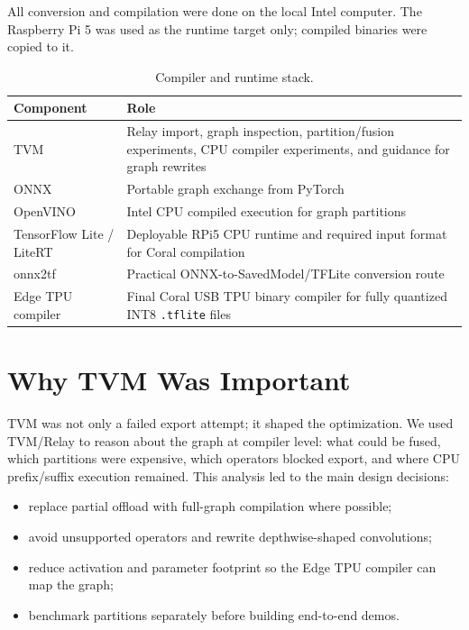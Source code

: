 \documentclass[11pt]{article}
\begin{document}
All conversion and compilation were done on the local Intel computer. The Raspberry Pi 5 was used as the runtime target only; compiled binaries were copied to it.

\begin{table}[H]
\centering
\caption{Compiler and runtime stack.}
\small
\begin{tabularx}{\textwidth}{Z{0.22\textwidth}Y}
\toprule
Component & Role \\
\midrule
TVM & Relay import, graph inspection, partition/fusion experiments, CPU compiler experiments, and guidance for graph rewrites \\
ONNX & Portable graph exchange from PyTorch \\
OpenVINO & Intel CPU compiled execution for graph partitions \\
TensorFlow Lite / LiteRT & Deployable RPi5 CPU runtime and required input format for Coral compilation \\
onnx2tf & Practical ONNX-to-SavedModel/TFLite conversion route \\
Edge TPU compiler & Final Coral USB TPU binary compiler for fully quantized INT8 \texttt{.tflite} files \\
\bottomrule
\end{tabularx}
\end{table}

\section{Why TVM Was Important}

TVM was not only a failed export attempt; it shaped the optimization. We used TVM/Relay to reason about the graph at compiler level: what could be fused, which partitions were expensive, which operators blocked export, and where CPU prefix/suffix execution remained. This analysis led to the main design decisions:

\begin{itemize}[leftmargin=*]
  \item replace partial offload with full-graph compilation where possible;
  \item avoid unsupported operators and rewrite depthwise-shaped convolutions;
  \item reduce activation and parameter footprint so the Edge TPU compiler can map the graph;
  \item benchmark partitions separately before building end-to-end demos.
\end{itemize}
\end{document}
